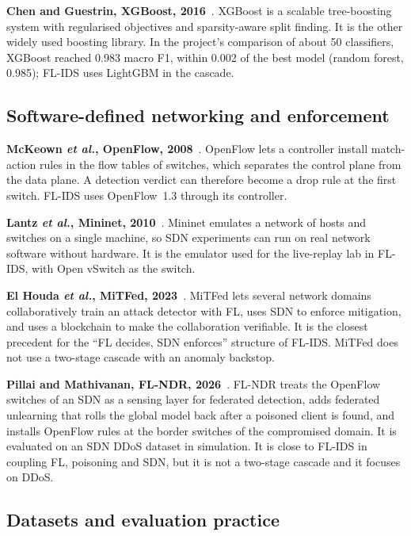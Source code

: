 \textbf{Chen and Guestrin, XGBoost, 2016}~\cite{chen2016xgboost}. XGBoost is a scalable tree-boosting system with regularised objectives and sparsity-aware split finding. It is the other widely used boosting library. In the project's comparison of about 50 classifiers, XGBoost reached 0.983 macro F1, within 0.002 of the best model (random forest, 0.985); FL-IDS uses LightGBM in the cascade.

\subsection{Software-defined networking and enforcement}

\textbf{McKeown \emph{et al.}, OpenFlow, 2008}~\cite{mckeown2008}. OpenFlow lets a controller install match-action rules in the flow tables of switches, which separates the control plane from the data plane. A detection verdict can therefore become a drop rule at the first switch. FL-IDS uses OpenFlow~1.3 through its controller.

\textbf{Lantz \emph{et al.}, Mininet, 2010}~\cite{lantz2010}. Mininet emulates a network of hosts and switches on a single machine, so SDN experiments can run on real network software without hardware. It is the emulator used for the live-replay lab in FL-IDS, with Open vSwitch as the switch.

\textbf{El Houda \emph{et al.}, MiTFed, 2023}~\cite{elhouda2023mitfed}. MiTFed lets several network domains collaboratively train an attack detector with FL, uses SDN to enforce mitigation, and uses a blockchain to make the collaboration verifiable. It is the closest precedent for the ``FL decides, SDN enforces'' structure of FL-IDS. MiTFed does not use a two-stage cascade with an anomaly backstop.

\textbf{Pillai and Mathivanan, FL-NDR, 2026}~\cite{pillai2026}. FL-NDR treats the OpenFlow switches of an SDN as a sensing layer for federated detection, adds federated unlearning that rolls the global model back after a poisoned client is found, and installs OpenFlow rules at the border switches of the compromised domain. It is evaluated on an SDN DDoS dataset in simulation. It is close to FL-IDS in coupling FL, poisoning and SDN, but it is not a two-stage cascade and it focuses on DDoS.

\subsection{Datasets and evaluation practice}

